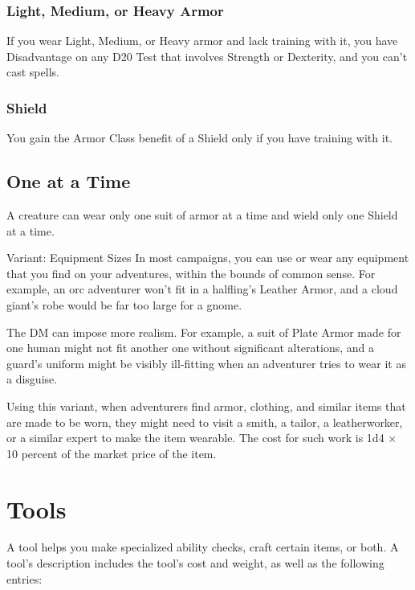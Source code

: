 \documentclass[10pt,a4paper,twoside,bg=print,twocolumn,openany,nodeprecatedcode]{dndbook}
\begin{document}
\subsubsection{Light, Medium, or Heavy Armor}
If you wear Light, Medium, or Heavy armor and lack training with it, you have Disadvantage on any D20 Test that involves Strength or Dexterity, and you can't cast spells.

\subsubsection{Shield}
You gain the Armor Class benefit of a Shield only if you have training with it.

\subsection{One at a Time}
A creature can wear only one suit of armor at a time and wield only one Shield at a time.

\begin{DndSidebar}[float=!b]{Variant: Equipment Sizes}
In most campaigns, you can use or wear any equipment that you find on your adventures, within the bounds of common sense. For example, an orc adventurer won't fit in a halfling's Leather Armor, and a cloud giant's robe would be far too large for a gnome.



The DM can impose more realism. For example, a suit of Plate Armor made for one human might not fit another one without significant alterations, and a guard's uniform might be visibly ill-fitting when an adventurer tries to wear it as a disguise.



Using this variant, when adventurers find armor, clothing, and similar items that are made to be worn, they might need to visit a smith, a tailor, a leatherworker, or a similar expert to make the item wearable. The cost for such work is 1d4 × 10 percent of the market price of the item.



\end{DndSidebar}

\section{Tools}
A tool helps you make specialized ability checks, craft certain items, or both. A tool's description includes the tool's cost and weight, as well as the following entries:
\end{document}
